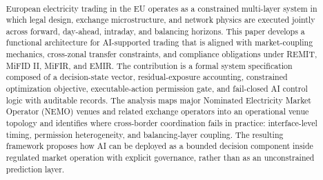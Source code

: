 \documentclass[oneside,10pt]{swissi}
\title{\papertitle \\[0.35em]
\normalsize \papersubtitle}
\author{{\fontsize{8}{10}\selectfont\paperauthors}\\[0.9em]
{\scriptsize\paperaffiliations}}
\date{\vspace{1.5em}}
\begin{document}
\maketitle

\begin{abstract}
European electricity trading in the EU operates as a constrained multi-layer system in which legal design, exchange microstructure, and network physics are executed jointly across forward, day-ahead, intraday, and balancing horizons. This paper develops a functional architecture for AI-supported trading that is aligned with market-coupling mechanics, cross-zonal transfer constraints, and compliance obligations under REMIT, MiFID II, MiFIR, and EMIR. The contribution is a formal system specification composed of a decision-state vector, residual-exposure accounting, constrained optimization objective, executable-action permission gate, and fail-closed AI control logic with auditable records. The analysis maps major Nominated Electricity Market Operator (NEMO) venues and related exchange operators into an operational venue topology and identifies where cross-border coordination fails in practice: interface-level timing, permission heterogeneity, and balancing-layer coupling. The resulting framework proposes how AI can be deployed as a bounded decision component inside regulated market operation with explicit governance, rather than as an unconstrained prediction layer.
\end{abstract}

\end{document}
